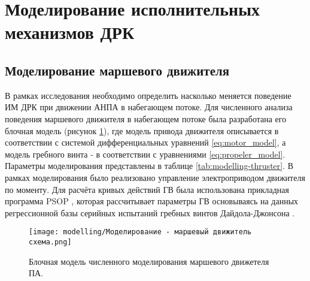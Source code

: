 \section{Моделирование исполнительных механизмов ДРК}
\subsection{Моделирование маршевого движителя}
В рамках исследования необходимо определить насколько меняется поведение ИМ ДРК при движении АНПА в набегающем потоке.
Для численного анализа поведения маршевого движителя в набегающем потоке была разработана его блочная модель (рисунок \ref{fig:modelling-thruster}), где модель привода движителя описывается в соответствии с системой дифференциальных уравнений \ref{eq:motor_model}, а модель гребного винта - в соответствии с уравнениями \ref{eq:propeler_model}.
Параметры моделирования представлены в таблице \ref{tab:modelling-thruster}.
В рамках моделирования было реализовано управление электроприводом движителя по моменту.
Для расчёта кривых действий ГВ была использована прикладная программа PSOP \cite{инзарцев2018подводные}, которая рассчитывает параметры ГВ основываясь на данных регрессионной
базы серийных испытаний гребных винтов Дайдола-Джонсона \cite{daidola1992propeller}.

\begin{figure}[ht]
    \centering
    \texttt{[image: modelling/Моделирование - маршевый движитель схема.png]}
    \caption{Блочная модель численного моделирования маршевого движетеля ПА.}
    \label{fig:modelling-thruster}
\end{figure}

